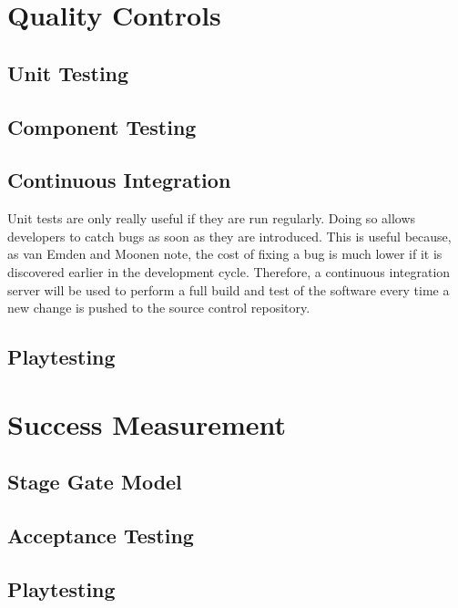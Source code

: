 \section{Quality Controls}
\label{section:quality}

\subsection{Unit Testing}

\subsection{Component Testing}

\subsection{Continuous Integration}

Unit tests are only really useful if they are run regularly. Doing so allows developers
to catch bugs as soon as they are introduced. This is useful because, as van Emden
and Moonen note, the cost of fixing a bug is much lower if it is discovered earlier in
the development cycle.\cite{emden2002} Therefore, a continuous integration server
will be used to perform a full build and test of the software every time a new change
is pushed to the source control repository.

\subsection{Playtesting}



\section{Success Measurement}

\subsection{Stage Gate Model}

\subsection{Acceptance Testing}

\subsection{Playtesting}
